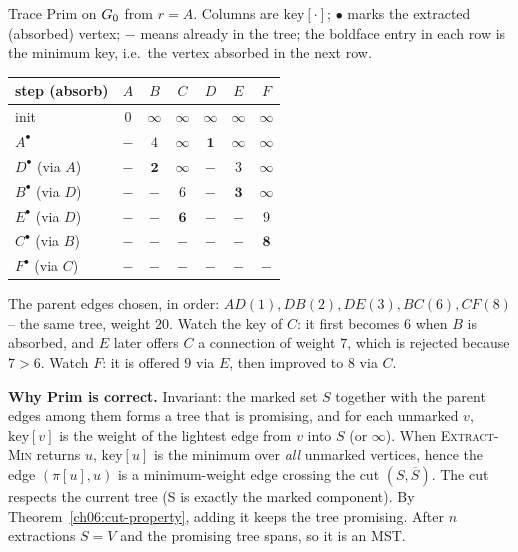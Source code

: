 \begin{labbox}
Trace Prim on $G_0$ from $r=A$. Columns are $\mathrm{key}[\cdot]$; $\bullet$ marks the extracted (absorbed) vertex; $-$ means already in the tree; the boldface entry in each row is the minimum key, i.e.\ the vertex absorbed in the next row.

\begin{center}
\begin{tabular}{lcccccc}
\toprule
step (absorb) & $A$ & $B$ & $C$ & $D$ & $E$ & $F$ \\
\midrule
init                & $0$ & $\infty$ & $\infty$ & $\infty$ & $\infty$ & $\infty$ \\
$A^\bullet$         & $-$ & $4$ & $\infty$ & $\mathbf 1$ & $\infty$ & $\infty$ \\
$D^\bullet$ (via $A$)& $-$ & $\mathbf 2$ & $\infty$ & $-$ & $3$ & $\infty$ \\
$B^\bullet$ (via $D$)& $-$ & $-$ & $6$ & $-$ & $\mathbf 3$ & $\infty$ \\
$E^\bullet$ (via $D$)& $-$ & $-$ & $\mathbf 6$ & $-$ & $-$ & $9$ \\
$C^\bullet$ (via $B$)& $-$ & $-$ & $-$ & $-$ & $-$ & $\mathbf 8$ \\
$F^\bullet$ (via $C$)& $-$ & $-$ & $-$ & $-$ & $-$ & $-$ \\
\bottomrule
\end{tabular}
\end{center}

The parent edges chosen, in order: $AD(1),DB(2),DE(3),BC(6),CF(8)$ -- the same tree, weight $20$. Watch the key of $C$: it first becomes $6$ when $B$ is absorbed, and $E$ later offers $C$ a connection of weight $7$, which is rejected because $7>6$. Watch $F$: it is offered $9$ via $E$, then improved to $8$ via $C$.
\end{labbox}

\begin{whybox}
\textbf{Why Prim is correct.} Invariant: the marked set $S$ together with the parent edges among them forms a tree that is promising, and for each unmarked $v$, $\mathrm{key}[v]$ is the weight of the lightest edge from $v$ into $S$ (or $\infty$). When \textsc{Extract-Min} returns $u$, $\mathrm{key}[u]$ is the minimum over \emph{all} unmarked vertices, hence the edge $(\pi[u],u)$ is a minimum-weight edge crossing the cut $(S,\overline S)$. The cut respects the current tree (S is exactly the marked component). By Theorem~\ref{ch06:cut-property}, adding it keeps the tree promising. After $n$ extractions $S=V$ and the promising tree spans, so it is an MST.
\end{whybox}

